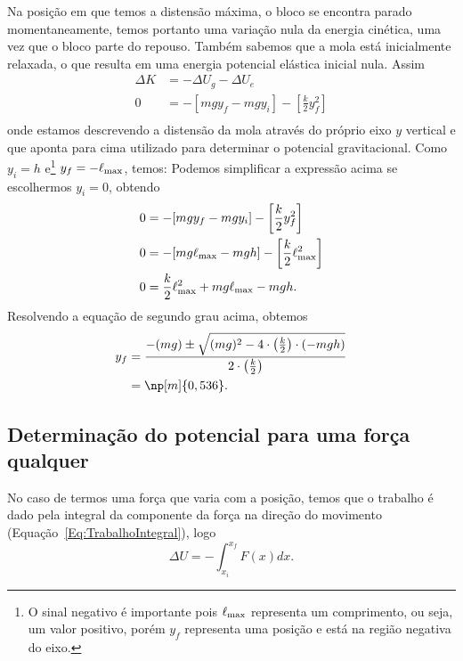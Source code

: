 Na posição em que temos a distensão máxima, o bloco se encontra parado momentaneamente, temos portanto uma variação nula da energia cinética, uma vez que o bloco parte do repouso. Também sabemos que a mola está inicialmente relaxada, o que resulta em uma energia potencial elástica inicial nula. Assim
\begin{align}
    \Delta K &= -\Delta U_g - \Delta U_e \\
    0 &= -[mg y_f - mg y_i] - \left[\frac{k}{2} y_f^2\right] \\
\end{align}
%
onde estamos descrevendo a distensão da mola através do próprio eixo $y$ vertical e que aponta para cima utilizado para determinar o potencial gravitacional. Como $y_i = h$ e\footnote{O sinal negativo é importante pois $\ell_{\rm{max}}$ representa um comprimento, ou seja, um valor positivo, porém $y_f$ representa uma posição e está na região negativa do eixo.} $y_f = -\ell_{\rm{max}}$, temos:
%
Podemos simplificar a expressão acima se escolhermos $y_i = 0$, obtendo
\begin{align}
    0 &= -[mg y_f - mg y_i] - \left[\frac{k}{2} y_f^2\right] \\
    0 &= -[mg \ell_{\rm{max}} - mg h] - \left[\frac{k}{2} \ell_{\rm{max}}^2\right] \\
    0 &= \frac{k}{2} \ell_{\rm{max}}^2 + mg \ell_{\rm{max}} - mgh.
\end{align}
%
Resolvendo a equação de segundo grau acima, obtemos
\begin{align}
    y_f &= \frac{-(mg) \pm \sqrt{(mg)^2 - 4\cdot\left(\frac{k}{2}\right)\cdot(-mgh)}}{2\cdot\left(\frac{k}{2}\right)}\\
    &= \np[m]{0,536}.
\end{align}

\subsection{Determinação do potencial para uma força qualquer}

No caso de termos uma força que varia com a posição, temos que o trabalho é dado pela integral da componente da força na direção do movimento (Equação~\eqref{Eq:TrabalhoIntegral}), logo
\begin{equation}\label{Eq:CalculoDoPotencial}
  \Delta U = - \int_{x_i}^{x_f} F(x) dx.
\end{equation}

